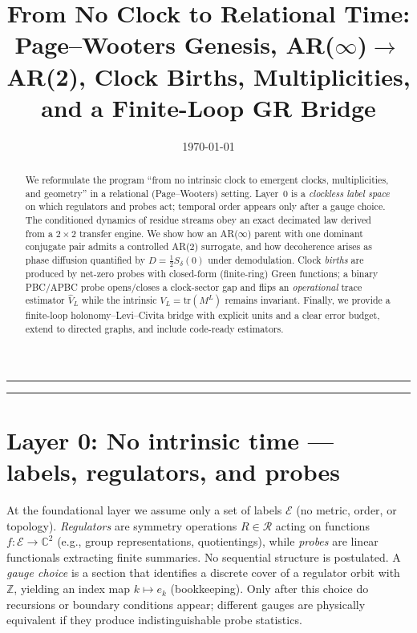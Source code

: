 \documentclass[11pt]{article}
\title{\vspace{-0.6cm}\Large From No Clock to Relational Time:\\
\large Page--Wooters Genesis, AR($\infty$)$\to$AR(2), Clock Births, Multiplicities, and a Finite-Loop GR Bridge}
\author{}
\date{\today}
\begin{document}
\maketitle
\vspace{-1.2em}\hrule\vspace{0.6em}

\begin{abstract}
We reformulate the program ``from no intrinsic clock to emergent clocks, multiplicities, and geometry'' in a relational (Page--Wooters) setting. Layer~0 is a \emph{clockless label space} on which regulators and probes act; temporal order appears only after a gauge choice. The conditioned dynamics of residue streams obey an exact decimated law derived from a $2\times2$ transfer engine. We show how an AR($\infty$) parent with one dominant conjugate pair admits a controlled AR(2) surrogate, and how decoherence arises as phase diffusion quantified by $D=\tfrac12 S_\delta(0)$ under demodulation. Clock \emph{births} are produced by net-zero probes with closed-form (finite-ring) Green functions; a binary PBC/APBC probe opens/closes a clock-sector gap and flips an \emph{operational} trace estimator $\widehat V_L$ while the intrinsic $V_L=\mathrm{tr}(M^L)$ remains invariant. Finally, we provide a finite-loop holonomy--Levi--Civita bridge with explicit units and a clear error budget, extend to directed graphs, and include code-ready estimators.
\end{abstract}

\tableofcontents
\vspace{0.6em}\hrule\vspace{0.8em}

\section{Layer 0: No intrinsic time --- labels, regulators, and probes}
\noindent At the foundational layer we assume only a set of labels $\mathcal{E}$ (no metric, order, or topology). \emph{Regulators} are symmetry operations $R\in\mathcal{R}$ acting on functions $f:\mathcal{E}\!\to\!\mathbb{C}^2$ (e.g., group representations, quotientings), while \emph{probes} are linear functionals extracting finite summaries. No sequential structure is postulated. A \emph{gauge choice} is a section that identifies a discrete cover of a regulator orbit with $\mathbb{Z}$, yielding an index map $k\!\mapsto\!e_k$ (bookkeeping). Only after this choice do recursions or boundary conditions appear; different gauges are physically equivalent if they produce indistinguishable probe statistics.
\end{document}
